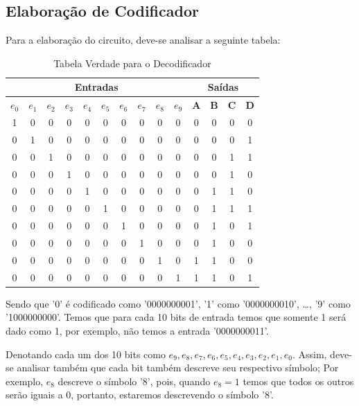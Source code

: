 \documentclass[12pt]{article}
\begin{document}
\subsection{Elaboração de Codificador}\label{sec:2.1}

Para a elaboração do circuito, deve-se analisar a seguinte tabela:
\begin{table}[H]
    \centering
    \caption{Tabela Verdade para o Decodificador}
    \begin{tabular}{|c|c|c|c|c|c|c|c|c|c||c|c|c|c|}\hline
    \multicolumn{10}{|c||}{Entradas} & \multicolumn{4}{|c|}{Saídas} \\\hline
    \textbf{$e_{0}$} & \textbf{$e_{1}$} & \textbf{$e_{2}$} & \textbf{$e_{3}$} & \textbf{$e_{4}$} & \textbf{$e_{5}$} & \textbf{$e_{6}$} & \textbf{$e_{7}$} & \textbf{$e_{8}$} & \textbf{$e_{9}$} & \textbf{A} & \textbf{B} & \textbf{C} & \textbf{D} \\\hline
    1 & 0 & 0 & 0 & 0 & 0 & 0 & 0 & 0 & 0 & 0 & 0 & 0 & 0\\\hline
    0 & 1 & 0 & 0 & 0 & 0 & 0 & 0 & 0 & 0 & 0 & 0 & 0 & 1\\\hline
    0 & 0 & 1 & 0 & 0 & 0 & 0 & 0 & 0 & 0 & 0 & 0 & 1 & 1 \\\hline
    0 & 0 & 0 & 1 & 0 & 0 & 0 & 0 & 0 & 0 & 0 & 0 & 1 & 0\\\hline
    0 & 0 & 0 & 0 & 1 & 0 & 0 & 0 & 0 & 0 & 0 & 1 & 1 & 0\\\hline
    0 & 0 & 0 & 0 & 0 & 1 & 0 & 0 & 0 & 0 & 0 & 1 & 1 & 1\\\hline
    0 & 0 & 0 & 0 & 0 & 0 & 1 & 0 & 0 & 0 & 0 & 1 & 0 & 1\\\hline
    0 & 0 & 0 & 0 & 0 & 0 & 0 & 1 & 0 & 0 & 0 & 1 & 0 & 0\\\hline
    0 & 0 & 0 & 0 & 0 & 0 & 0 & 0 & 1 & 0 & 1 & 1 & 0 & 0\\\hline
    0 & 0 & 0 & 0 & 0 & 0 & 0 & 0 & 0 & 1 & 1 & 1 & 0 & 1\\\hline
    \end{tabular}\label{tab:tabela_and}
\end{table}

Sendo que '0' é codificado como '0000000001', '1' como '0000000010', \ldots,
'9' como '1000000000'. Temos que para cada 10 bits de entrada temos que somente
1 será dado como 1, por exemplo, não temos a entrada '0000000011'.

Denotando cada um dos 10 bits como
$e_{9},e_{8},e_{7},e_{6},e_{5},e_{4},e_{3},e_{2},e_{1},e_{0}$. Assim, deve-se
analisar também que cada bit também descreve seu respectivo símbolo; Por
exemplo, $e_{8}$ descreve o símbolo '8', pois, quando $e_{8}=1$ temos que todos
os outros serão iguais a 0, portanto, estaremos descrevendo o símbolo '8'.
\end{document}
